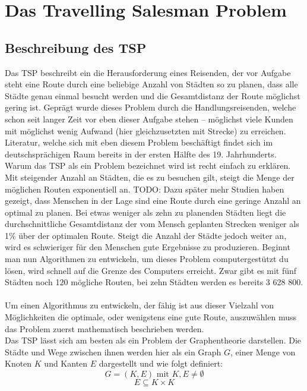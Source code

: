 \chapter{Das Travelling Salesman Problem}
\section{Beschreibung des \ac{TSP}}
Das \ac{TSP} beschreibt ein die Herausforderung eines Reisenden, der vor Aufgabe steht eine Route durch eine beliebige Anzahl von Städten so zu planen, dass alle Städte genau einmal besucht werden und die Gesamtdistanz der Route möglichst gering ist.
Geprägt wurde dieses Problem durch die Handlungsreisenden, welche schon seit langer Zeit vor eben dieser Aufgabe stehen -- möglichst viele Kunden mit möglichst wenig Aufwand (hier gleichzusetzten mit Strecke) zu erreichen.
Literatur, welche sich mit eben diesem Problem beschäftigt findet sich im deutschsprächigen Raum bereits in der ersten Hälfte des 19. Jahrhunderts. \autocite[siehe Abb. 1.1, S. 3]{Applegate.2006}
Warum das \ac{TSP} als ein Problem bezeichnet wird ist recht einfach zu erklären.
Mit steigender Anzahl an Städten, die es zu besuchen gilt, steigt die Menge der möglichen Routen exponentiell an. TODO: Dazu später mehr
Studien haben gezeigt, dass Menschen in der Lage sind eine Route durch eine geringe Anzahl an optimal zu planen.
Bei etwas weniger als zehn zu planenden Städten liegt die durchschnittliche Gesamtdistanz der vom Mensch geplanten Strecken weniger als 1\% über der optimalen Route. \autocite[530]{Macgregor.1996}
Steigt die Anzahl der Städte jedoch weiter an, wird es schwieriger für den Menschen gute Ergebnisse zu produzieren.
Beginnt man nun Algorithmen zu entwickeln, um dieses Problem computergestützt du lösen, wird schnell auf die Grenze des Computers erreicht.
Zwar gibt es mit fünf Städten noch 120 mögliche Routen, bei zehn Städten werden es bereits 3 628 800.
\\\\
Um einen Algorithmus zu entwickeln, der fähig ist aus dieser Vielzahl von Möglichkeiten die optimale, oder wenigstens eine gute Route, auszuwählen muss das Problem zuerst mathematisch beschrieben werden.
\\
Das \ac{TSP} lässt sich am besten als ein Problem der Graphentheorie darstellen.
Die Städte und Wege zwischen ihnen werden hier als ein Graph $G$, einer Menge von Knoten $K$ und Kanten $E$ dargestellt und wie folgt definiert: \autocite[S. 71ff.]{Domschke.2015}
$$G=(K,E) \textrm{ mit } K,E \neq \emptyset$$
$$E \subseteq K \times K$$
